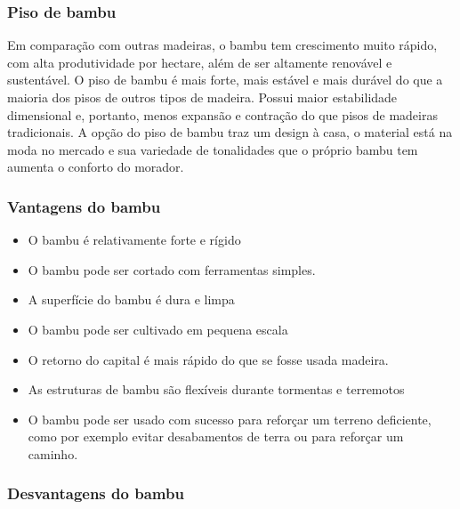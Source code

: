 \subsubsection*{\textbf{Piso de bambu}}

	Em comparação com outras madeiras, o bambu tem crescimento muito rápido, com alta produtividade por hectare, além de ser altamente renovável e sustentável. O piso de bambu é mais forte, mais estável e mais durável do que a maioria dos pisos de outros tipos de madeira. Possui maior estabilidade dimensional e, portanto, menos expansão e contração do que pisos de madeiras tradicionais. A opção do piso de bambu traz um design à casa, o material está na moda no mercado e sua variedade de tonalidades que o próprio bambu tem aumenta o conforto do morador.


\subsubsection*{\textbf{Vantagens do bambu}}

	\begin{itemize}

		\item O bambu é relativamente forte e rígido

		\item O bambu pode ser cortado com ferramentas simples.

		\item A superfície do bambu é dura e limpa

		\item O bambu pode ser cultivado em pequena escala

		\item O retorno do capital é mais rápido do que se fosse usada madeira.

		\item As estruturas de bambu são flexíveis durante tormentas e terremotos

		\item O bambu pode ser usado com sucesso para reforçar um terreno deficiente, como por exemplo evitar desabamentos de terra ou para reforçar um caminho.
	\end{itemize}

\subsubsection*{\textbf{Desvantagens do bambu}}


